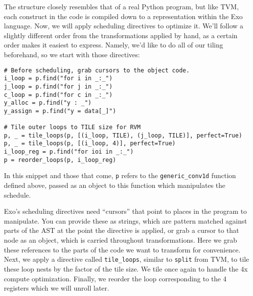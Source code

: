\documentclass[acmsmall, nonacm=true]{acmart}
\begin{document}
The structure closely resembles that of a real Python program, but like TVM, each construct in the code is compiled down to a representation within the Exo language. Now, we will apply scheduling directives to optimize it. We'll follow a slightly different order from the transformations applied by hand, as a certain order makes it easiest to express. Namely, we'd like to do all of our tiling beforehand, so we start with those directives:
\begin{verbatim}
# Before scheduling, grab cursors to the object code.
i_loop = p.find("for i in _:_")
j_loop = p.find("for j in _:_")
c_loop = p.find("for c in _:_")
y_alloc = p.find("y : _")
y_assign = p.find("y = data[_]")

# Tile outer loops to TILE size for RVM
p, _ = tile_loops(p, [(i_loop, TILE), (j_loop, TILE)], perfect=True)
p, _ = tile_loops(p, [(i_loop, 4)], perfect=True)
i_loop_reg = p.find("for ioi in _:_")
p = reorder_loops(p, i_loop_reg)
\end{verbatim}

In this snippet and those that come, \verb|p| refers to the \verb|generic_conv1d| function defined above, passed as an object to this function which manipulates the schedule. 

Exo's scheduling directives need ``cursors'' that point to places in the program to manipulate. You can provide these as strings, which are pattern matched against parts of the AST at the point the directive is applied, or grab a cursor to that node as an object, which is carried throughout transformations. Here we grab these references to the parts of the code we want to transform for convenience. Next, we apply a directive called \verb|tile_loops|, similar to \verb|split| from TVM, to tile these loop nests by the factor of the tile size. We tile once again to handle the 4x compute optimization. Finally, we reorder the loop corresponding to the 4 registers which we will unroll later.
\end{document}
